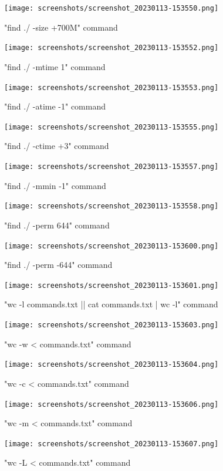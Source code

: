 \documentclass[b5paper]{article}
\begin{document}
\begin{figure} \centering \texttt{[image: screenshots/screenshot\_20230113-153550.png]} \caption{"find ./ -size +700M" command} \end{figure}
\begin{figure} \centering \texttt{[image: screenshots/screenshot\_20230113-153552.png]} \caption{"find ./ -mtime 1" command} \end{figure}
\begin{figure} \centering \texttt{[image: screenshots/screenshot\_20230113-153553.png]} \caption{"find ./ -atime -1" command} \end{figure}
\begin{figure} \centering \texttt{[image: screenshots/screenshot\_20230113-153555.png]} \caption{"find ./ -ctime +3" command} \end{figure}
\begin{figure} \centering \texttt{[image: screenshots/screenshot\_20230113-153557.png]} \caption{"find ./ -mmin -1" command} \end{figure}
\begin{figure} \centering \texttt{[image: screenshots/screenshot\_20230113-153558.png]} \caption{"find ./ -perm 644" command} \end{figure}
\begin{figure} \centering \texttt{[image: screenshots/screenshot\_20230113-153600.png]} \caption{"find ./ -perm -644" command} \end{figure}
\begin{figure} \centering \texttt{[image: screenshots/screenshot\_20230113-153601.png]} \caption{"wc -l commands.txt || cat commands.txt | wc -l" command} \end{figure}
\begin{figure} \centering \texttt{[image: screenshots/screenshot\_20230113-153603.png]} \caption{"wc -w < commands.txt" command} \end{figure}
\begin{figure} \centering \texttt{[image: screenshots/screenshot\_20230113-153604.png]} \caption{"wc -c < commands.txt" command} \end{figure}
\begin{figure} \centering \texttt{[image: screenshots/screenshot\_20230113-153606.png]} \caption{"wc -m < commands.txt" command} \end{figure}
\begin{figure} \centering \texttt{[image: screenshots/screenshot\_20230113-153607.png]} \caption{"wc -L < commands.txt" command} \end{figure}
\end{document}
